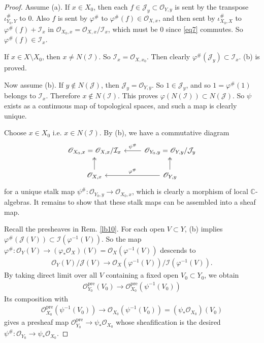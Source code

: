 \documentclass[12pt,b5paper,notitlepage]{report}
\theoremstyle{definition}
\theoremstyle{plain}
\newcommand{\mc}{\mathcal}
\newcommand{\scr}{\mathscr}
\newcommand{\Cbb}{\mathbb C}
\newcommand{\pre}{\mathrm{pre}}
\numberwithin{equation}{section}
\begin{document}
\begin{proof}
Assume (a). If $x\in X_0$, then each $f\in\mc J_y\subset\scr O_{Y,y}$ is sent by the transpose $\iota_{Y_0,Y}^\#$ to $0$. Also $f$ is sent by $\varphi^\#$ to $\varphi^\#(f)\in\scr O_{X,x}$, and then sent by $\iota_{X_0,X}^\#$ to $\varphi^\#(f)+\mc I_x$ in $\scr O_{X_0,x}=\scr O_{X,x}/\mc I_x$, which must be $0$ since \eqref{eq7} commutes. So $\varphi^\#(f)\in\mc I_x$.

If $x\in X\setminus X_0$, then $x\neq N(\mc I)$. So $\mc I_x=\scr O_{X,x_0}$. Then clearly $\varphi^\#(\mc J_y)\subset\mc I_x$. (b) is proved.

Now assume (b). If $y\notin N(\mc J)$, then $\mc J_y=\scr O_{Y,y}$. So $1\in\mc J_y$, and so $1=\varphi^\#(1)$ belongs to $\mc I_x$. Therefore $x\notin N(\mc I)$. This proves $\varphi(N(\mc I))\subset N(\mc J)$. So $\psi$ exists as a continuous map of topological spaces, and such a map is clearly unique.

Choose $x\in X_0$ i.e. $x\in N(\mc I)$. By (b), we have a commutative diagram
\begin{equation*}
\begin{tikzcd}
\scr O_{X_0,x}=\scr O_{X,x}/\mc I_x                     & \scr O_{Y_0,y}=\scr O_{Y,y}/\mc J_y \arrow[l,"\psi^\#"']                      \\
\scr O_{X,x} \arrow[u, two heads] & \scr O_{Y,y} \arrow[l,"\varphi^\#"'] \arrow[u, two heads]
\end{tikzcd}
\end{equation*}
for a unique stalk map $\psi^\#:\scr O_{Y_0,y}\rightarrow\scr O_{X_0,x}$, which is clearly a morphism of local $\Cbb$-algebras. It remains to show that these stalk maps can be assembled into a sheaf map. 

Recall the presheaves in Rem. \ref{lb10}. For each open $V\subset Y$,  (b) implies $\varphi^\#(\mc J(V))\subset\mc I(\varphi^{-1}(V))$. So the map $\varphi^\#:\scr O_Y(V)\rightarrow (\varphi_*\scr O_X)(V)=\scr O_X(\varphi^{-1}(V))$ descends to
\begin{align*}
\scr O_Y(V)/\mc J(V)\rightarrow \scr O_X(\varphi^{-1}(V))/\mc I(\varphi^{-1}(V)).
\end{align*}
By taking direct limit over all $V$ containing a fixed open $V_0\subset Y_0$, we obtain
\begin{align*}
\scr O_{Y_0}^\pre(V_0)\rightarrow \scr O_{X_0}^\pre(\psi^{-1}(V_0))
\end{align*}
Its composition with
\begin{align*}
\scr O_{X_0}^\pre(\psi^{-1}(V_0))\rightarrow\scr O_{X_0}(\psi^{-1}(V_0))=(\psi_*\scr O_{X_0})(V_0)
\end{align*}
gives a presheaf map $\scr O_{Y_0}^\pre\rightarrow\psi_*\scr O_{X_0}$  whose sheafification is the desired $\psi^\#:\scr O_{Y_0}\rightarrow\psi_*\scr O_{X_0}$.
\end{proof}
\end{document}
